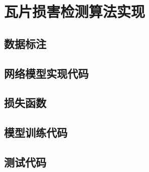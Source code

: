 \section{瓦片损害检测算法实现}
\setcounter{figure}{0}

\subsection{数据标注}

\subsection{网络模型实现代码}

\subsection{损失函数}

\subsection{模型训练代码}

\subsection{测试代码}
